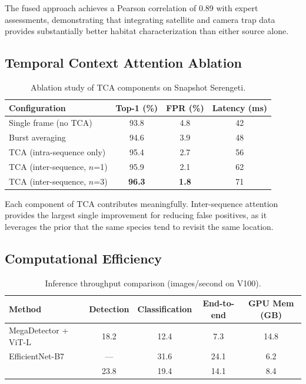 The fused approach achieves a Pearson correlation of 0.89 with expert assessments, demonstrating that integrating satellite and camera trap data provides substantially better habitat characterization than either source alone.

\subsection{Temporal Context Attention Ablation}

\begin{table}[htbp]
\centering
\caption{Ablation study of TCA components on Snapshot Serengeti.}
\label{tab:tca_ablation}
\begin{tabular}{lccc}
\toprule
\textbf{Configuration} & \textbf{Top-1 (\%)} & \textbf{FPR (\%)} & \textbf{Latency (ms)} \\
\midrule
Single frame (no TCA) & 93.8 & 4.8 & 42 \\
Burst averaging & 94.6 & 3.9 & 48 \\
TCA (intra-sequence only) & 95.4 & 2.7 & 56 \\
TCA (inter-sequence, $n$=1) & 95.9 & 2.1 & 62 \\
TCA (inter-sequence, $n$=3) & \textbf{96.3} & \textbf{1.8} & 71 \\
\bottomrule
\end{tabular}
\end{table}

Each component of TCA contributes meaningfully. Inter-sequence attention provides the largest single improvement for reducing false positives, as it leverages the prior that the same species tend to revisit the same location.

\subsection{Computational Efficiency}

\begin{table}[htbp]
\centering
\caption{Inference throughput comparison (images/second on V100).}
\label{tab:efficiency}
\begin{tabular}{lcccc}
\toprule
\textbf{Method} & \textbf{Detection} & \textbf{Classification} & \textbf{End-to-end} & \textbf{GPU Mem (GB)} \\
\midrule
MegaDetector + ViT-L & 18.2 & 12.4 & 7.3 & 14.8 \\
EfficientNet-B7 & --- & 31.6 & 24.1 & 6.2 \\
\ConservAI{} & 23.8 & 19.4 & 14.1 & 8.4 \\
\bottomrule
\end{tabular}
\end{table}

